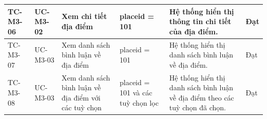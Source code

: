 \begin{landscape}
\begin{longtable}{|p{2.2cm}|p{2.2cm}|p{4cm}|p{4.5cm}|p{6cm}|p{2cm}|}
TC-M3-06 & UC-M3-02 & Xem chi tiết địa điểm & 
placeid = 101 & 
Hệ thống hiển thị thông tin chi tiết của địa điểm. & Đạt \\
\hline

TC-M3-07 & UC-M3-03 & Xem danh sách bình luận về địa điểm & 
placeid = 101 & 
Hệ thống hiển thị danh sách bình luận về địa điểm. & Đạt \\
\hline

TC-M3-08 & UC-M3-03 & Xem danh sách bình luận về địa điểm với các tuỳ chọn & 
placeid = 101 và các tuỳ chọn lọc & 
Hệ thống hiển thị danh sách bình luận về địa điểm theo các tuỳ chọn đã chọn. & Đạt \\
\hline


\end{longtable}
\end{landscape}
